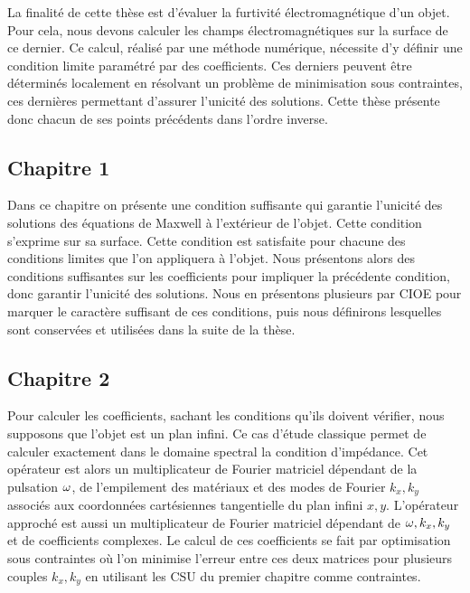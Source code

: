 La finalité de cette thèse est d'évaluer la furtivité électromagnétique d'un objet. Pour cela, nous devons calculer les champs électromagnétiques sur la surface de ce dernier. Ce calcul, réalisé par une méthode numérique, nécessite d'y définir une condition limite paramétré par des coefficients. Ces derniers peuvent être déterminés localement en résolvant un problème de minimisation sous contraintes, ces dernières permettant d'assurer l'unicité des solutions. Cette thèse présente donc chacun de ses points précédents dans l'ordre inverse.

\subsection*{Chapitre 1}
Dans ce chapitre on présente une condition suffisante qui garantie l'unicité des solutions des équations de Maxwell à l'extérieur de l'objet.
Cette condition s'exprime sur sa surface. Cette condition est satisfaite pour chacune des conditions limites que l'on appliquera à l'objet. Nous présentons alors des conditions suffisantes sur les coefficients pour impliquer la précédente condition, donc garantir l'unicité des solutions.
Nous en présentons plusieurs par CIOE pour marquer le caractère suffisant de ces conditions, puis nous définirons lesquelles sont conservées et utilisées dans la suite de la thèse.

\subsection*{Chapitre 2}
Pour calculer les coefficients, sachant les conditions qu'ils doivent vérifier, nous supposons que l'objet est un plan infini. Ce cas d'étude classique permet de calculer exactement dans le domaine spectral la condition d’impédance. 
Cet opérateur est alors un multiplicateur de Fourier matriciel dépendant de la pulsation \(\omega\), de l'empilement des matériaux et des modes de Fourier \(k_x, k_y\) associés aux coordonnées cartésiennes tangentielle du plan infini \(x,y\).
L'opérateur approché est aussi un multiplicateur de Fourier matriciel dépendant de \(\omega, k_x, k_y\) et de coefficients complexes.
Le calcul de ces coefficients se fait par optimisation sous contraintes où l'on minimise l'erreur entre ces deux matrices pour plusieurs couples \(k_x,k_y\) en utilisant les CSU du premier chapitre comme contraintes.

